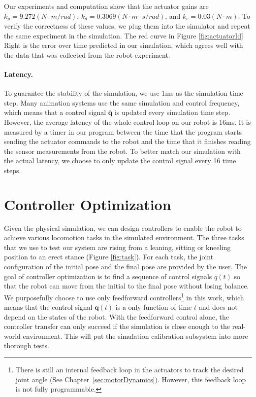 Our experiments and computation show that the actuator gains are $k_p=9.272(N\cdot m/rad)$, $k_d=0.3069(N\cdot m\cdot s/rad)$, and $k_c=0.03(N\cdot m)$. To verify the correctness of these values, we plug them into the simulator and repeat the same experiment in the simulation. The red curve in Figure \ref{fig:actuatorId} Right is the error over time predicted in our simulation, which agrees well with the data that was collected from the robot experiment.

\paragraph{Latency.} To guarantee the stability of the simulation, we use 1ms as the simulation time step. Many animation systems use the same simulation and control frequency, which means that a control signal $\bar{\mathbf{q}}$ is updated every simulation time step. However, the average latency of the whole control loop on our robot is 16ms. It is measured by a timer in our program between the time that the program starts sending the actuator commands to the robot and the time that it finishes reading the sensor measurements from the robot. To better match our simulation with the actual latency, we choose to only update the control signal every 16 time steps.

\section{Controller Optimization}

Given the physical simulation, we can design controllers to enable the robot to achieve various locomotion tasks in the simulated environment. The three tasks that we use to test our system are rising from a leaning, sitting or kneeling position to an erect stance (Figure \ref{fig:task}). For each task, the joint configuration of the initial pose and the final pose are provided by the user. The goal of controller optimization is to find a sequence of control signals $\bar{q}(t)$ so that the robot can move from the initial to the final pose without losing balance. We purposefully choose to use only feedforward controllers\footnote{There is still an internal feedback loop in the actuators to track the desired joint angle (See Chapter~\ref{sec:motorDynamics}). However, this feedback loop is not fully programmable.} in this work, which means that the control signal $\bar{\mathbf{q}}(t)$ is a only function of time $t$ and does not depend on the states of the robot. With the feedforward control alone, the controller transfer can only succeed if the simulation is close enough to the real-world environment. This will put the simulation calibration subsystem into more thorough tests.


